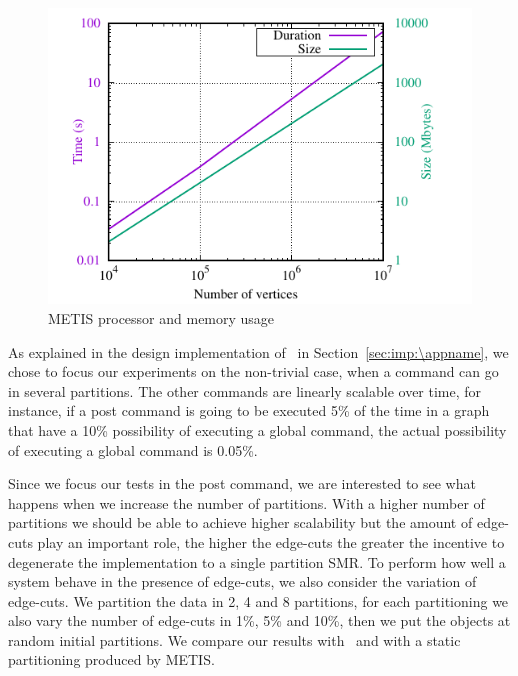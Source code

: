 \begin{figure}[ht!]
  \centering
    \includegraphics[width=\columnwidth]{figures/metis_size_time}
	\caption{METIS processor and memory usage}
	\label{fig:metis_size_time}
\end{figure}

As explained in the design implementation of \appname\ in Section~\ref{sec:imp:\appname}, we chose to focus our
experiments on the non-trivial case, when a command can go in several partitions. The other commands are linearly
scalable over time, for instance, if a post command is going to be executed 5\% of the time in a graph that have a 10\%
possibility of executing a global command, the actual possibility of executing a global command is 0.05\%.

Since we focus our tests in the post command, we are interested to see what happens when we increase the number of
partitions. With a higher number of partitions we should be able to achieve higher scalability but the amount of edge-cuts
play an important role, the higher the edge-cuts the greater the incentive to degenerate the implementation to a single
partition SMR. To perform how well a system behave in the presence of edge-cuts, we also consider the variation of
edge-cuts. We partition the data in 2, 4 and 8 partitions, for each partitioning we also vary the number of edge-cuts 
in 1\%, 5\% and 10\%, then we put the objects at random initial partitions.
We compare our results with \dssmr\ and \ssmr with a static partitioning produced by METIS.

